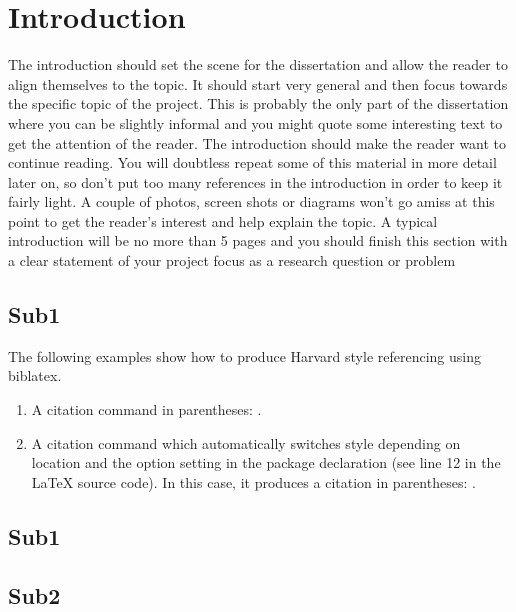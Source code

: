 \documentclass[a4paper, 12pt]{article}
\begin{document}
\section{Introduction}
The introduction should set the scene for the dissertation and allow the reader to align themselves to the topic. It should start very general and then focus towards the specific topic of the project. This is probably the only part of the dissertation where you can be slightly informal and you might quote some interesting text to get the attention of the reader. The introduction should make the reader want to continue reading. You will doubtless repeat some of this material in more detail later on, so don’t put too many references in the introduction in order to keep it fairly light. A couple of photos, screen shots or diagrams won’t go amiss at this point to get the reader’s interest and help explain the topic. A typical introduction will be no more than 5 pages and you should finish this section with a clear statement of your project focus as a research question or problem


\subsection{Sub1}


The following examples show how to produce Harvard style referencing using biblatex.

\begin{enumerate}
	\item A citation command in parentheses: \parencite{Smith:2012qr}.
	\item A citation command which automatically switches style depending on location and the option setting in the package declaration (see line 12 in the LaTeX source code). In this case, it produces a citation in parentheses: \autocite{Other:2014ab}.
\end{enumerate}


\subsection{Sub1}


\subsection{Sub2}
\end{document}
